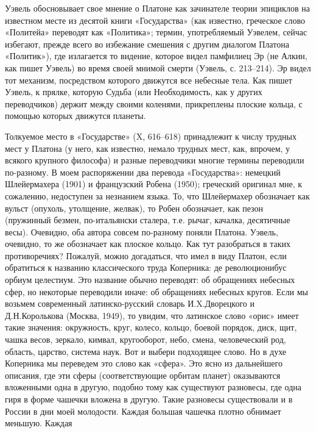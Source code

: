 Уэвель  обосновывает  свое  мнение  о Платоне  как  зачинателе  теории
эпициклов  на  известном месте  из  десятой  книги «Государства»  (как
известно, греческое слово «Политейа» переводят как «Политика»; термин,
употребляемый  Уэвелем, сейчас  избегают,  прежде  всего во  избежание
смешения  с  другим диалогом  Платона  «Политик»),  где излагается  то
видение, которое  видел памфилиец Эр  (не Алкин, как пишет  Уэвель) во
время  своей  мнимой  смерти  (Уэвель,  с.  213--214).  Эр  видел  тот
механизм, посредством  которого движутся все небесные  тела. Как пишет
Уэвель,  к прялке,  которую Судьба  (или Необходимость,  как у  других
переводчиков)  держит  между   своими  коленями,  прикреплены  плоские
кольца, с помощью которых движутся планеты.

Толкуемое  место в  «Государстве»  (X, 616--618)  принадлежит к  числу
трудных мест  у Платона  (у него, как  известно, немало  трудных мест,
как,  впрочем,  у  всякого  крупного философа)  и  разные  переводчики
многие  термины   переводили  по-разному.  В  моем   распоряжении  два
перевода  «Государства»: немецкий  Шлейермахера  (1901) и  французский
Робена  (1950); греческий  оригинал  мне, к  сожалению, недоступен  за
незнанием языка.  То, что Шлейермахер обозначает  как вульст (опухоль,
утолщение,  желвак),   то  Робен  обозначает,  как   пезон  (пружинный
безмен, по-итальянски сталера, т.е.  рычаг, качалка, десятичные весы).
Очевидно,  оба  автора  совсем   по-разному  поняли  Платона.  Уэвель,
очевидно, то же  обозначает как плоское кольцо. Как  тут разобраться в
таких  противоречиях?  Пожалуй,  можно  догадаться, что  имел  в  виду
Платон, если  обратиться к названию классического  труда Коперника: де
революционибус  орбиум целестиум.  Это название  обычно переводят:  об
обращениях небесных сфер, но некоторые переводили иначе: об обращениях
небесных кругов. Если мы  возьмем современный латинско-русский словарь
И.X.Дворецкого  и  Д.Н.Королькова  (Москва,   1949),  то  увидим,  что
латинское слово «орис» имеет такие значения: окружность, круг, колесо,
кольцо,  боевой  порядок, диск,  щит,  чашка  весов, зеркало,  кимвал,
кругооборот, небо, смена, человеческий  род, область, царство, система
наук. Вот и выбери подходящее слово.  Но в духе Коперника мы переведем
это слово как «сфера». Это ясно из дальнейшего описания, где эти сферы
(соответствующие орбитам планет) оказываются вложенными одна в другую,
подобно тому как  существуют разновесы, где одна гиря  в форме чашечки
вложена в другую.  Такие разновесы существовали и в России  в дни моей
молодости.  Каждая большая  чашечка  плотно  обнимает меньшую.  Каждая
